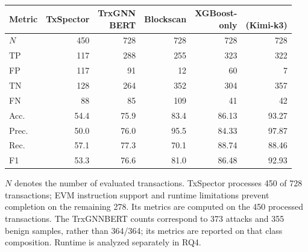 \begin{table}[t]
\centering\color{blue}\small
\caption{}
\label{tab:performance-dsystem-compact}
\setlength{\tabcolsep}{2pt}
\begin{tabular}{@{}lrrrrr@{}}
\toprule
Metric & TxSpector & \makecell{TrxGNN\\BERT} & Blockscan & \makecell{XGBoost-\\only} & \makecell{\approach{}\\(Kimi-k3)}\\
\midrule
$N$ &450&728&728&728&728\\
TP &117&288&255&323&322\\
FP &117&91&12&60&7\\
TN &128&264&352&304&357\\
FN &88&85&109&41&42\\
\midrule
Acc. &54.4&75.9&83.4&86.13&93.27\\
Prec. &50.0&76.0&95.5&84.33&97.87\\
Rec. &57.1&77.3&70.1&88.74&88.46\\
F1 &53.3&76.6&81.0&86.48&92.93\\
\bottomrule
\end{tabular}
\smallskip\par\footnotesize
$N$ denotes the number of evaluated transactions. TxSpector processes 450 of 728 transactions; EVM instruction support and runtime limitations prevent completion on the remaining 278. Its metrics are computed on the 450 processed transactions. The TrxGNNBERT counts correspond to 373 attacks and 355 benign samples, rather than 364/364; its metrics are reported on that class composition. Runtime is analyzed separately in RQ4.
\end{table}




